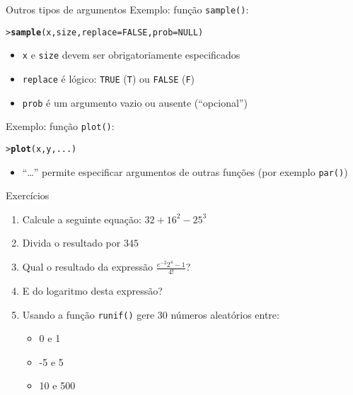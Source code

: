 \documentclass[10pt,handout]{beamer}\usepackage{graphicx, color}
\makeatletter
\newcommand{\hlfunctioncall}[1]{\textcolor[rgb]{0,0,0.545098039215686}{\textbf{#1}}}%
\newenvironment{kframe}{%
 \def\at@end@of@kframe{}%
 \ifinner\ifhmode%
  \def\at@end@of@kframe{\end{minipage}}%
  \begin{minipage}{\columnwidth}%
 \fi\fi%
 \def\FrameCommand##1{\hskip\@totalleftmargin \hskip-\fboxsep
 \colorbox{shadecolor}{##1}\hskip-\fboxsep
     \hskip-\linewidth \hskip-\@totalleftmargin \hskip\columnwidth}%
 \MakeFramed {\advance\hsize-\width
   \@totalleftmargin\z@ \linewidth\hsize
   \@setminipage}}%
 {\par\unskip\endMakeFramed%
 \at@end@of@kframe}
\newenvironment{knitrout}{}{} %
\makeatother
\begin{document}
\begin{frame}[fragile=singleslide]{Outros tipos de argumentos}
Exemplo: função \verb|sample()|:
\begin{knitrout}\small
{}\color{fgcolor}\begin{kframe}
\begin{alltt}
> \hlfunctioncall{sample}(x, size, replace = FALSE, prob = NULL)
\end{alltt}
\end{kframe}
\end{knitrout}

\begin{itemize}
\item \verb|x| e \verb|size| devem ser obrigatoriamente especificados
\item \verb|replace| é lógico: \verb|TRUE| (\verb|T|) ou \verb|FALSE|
  (\verb|F|)
\item \verb|prob| é um argumento vazio ou ausente (``opcional'')
\end{itemize}
Exemplo: função \verb|plot()|:
\begin{knitrout}\small
{}\color{fgcolor}\begin{kframe}
\begin{alltt}
> \hlfunctioncall{plot}(x, y, ...)
\end{alltt}
\end{kframe}
\end{knitrout}

\begin{itemize}
\item ``\ldots'' permite especificar argumentos de outras funções (por
  exemplo \verb|par()|)
\end{itemize}
\end{frame}

\begin{frame}[fragile=singleslide]{Exercícios}
  \begin{enumerate}
  \item Calcule a seguinte equação: $32 + 16^2 - 25^3$
  \item Divida o resultado por $345$
  \item Qual o resultado da expressão $\frac{e^{-2}  2^{4} - 1}{4!}$?
  \item E do logaritmo desta expressão?
  \item Usando a função \verb|runif()| gere $30$ números aleatórios entre:
    \begin{itemize}
    \item 0 e 1
    \item -5 e 5
    \item 10 e 500
    \end{itemize}
  \end{enumerate}
\end{frame}
\end{document}
